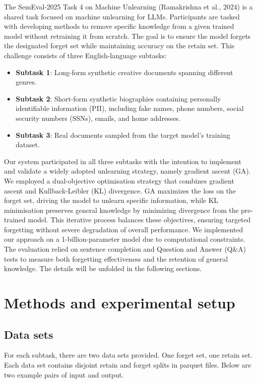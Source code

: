 \documentclass[11pt]{article}
\begin{document}
The SemEval-2025 Task 4 on Machine Unlearning (Ramakrishna et al., 2024) is a shared task focused on machine unlearning for LLMs. Participants are tasked with developing methods to remove specific knowledge from a given trained model without retraining it from scratch. The goal is to ensure the model forgets the designated forget set while maintaining accuracy on the retain set. This challenge consists of three English-language subtasks:
\begin{itemize}
    \item \textbf{Subtask 1}: Long-form synthetic creative documents spanning different genres. 
    \item \textbf{Subtask 2}: Short-form synthetic biographies containing personally identifiable information (PII), including fake names, phone numbers, social security numbers (SSNs), emails, and home addresses. 
    \item \textbf{Subtask 3}: Real documents sampled from the target model’s training dataset. 
\end{itemize}

Our system participated in all three subtasks with the intention to implement and validate a widely adopted unlearning strategy, namely gradient ascent (GA). We employed a dual-objective optimisation strategy that combines gradient ascent and Kullback-Leibler (KL) divergence. GA maximizes the loss on the forget set, driving the model to unlearn specific information, while KL minimisation preserves general knowledge by minimizing divergence from the pre-trained model. This iterative process balances these objectives, ensuring targeted forgetting without severe degradation of overall performance. We implemented our approach on a 1-billion-parameter model due to computational constraints. The evaluation relied on sentence completion and Question and Answer (Q\&A) tests to measure both forgetting effectiveness and the retention of general knowledge. The details will be unfolded in the following sections.




\section{Methods and experimental setup}

\subsection*{Data sets}
For each subtask, there are two data sets provided. One forget set, one retain set. Each data set contains disjoint retain and forget splits in parquet files. Below are two example pairs of input and output.
\end{document}

